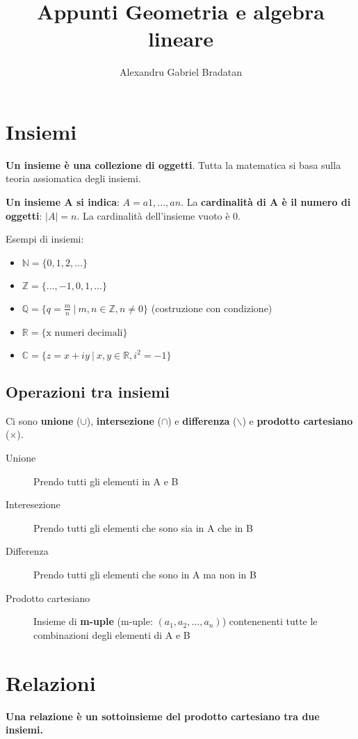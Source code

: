 \documentclass[a4paper,12pt,oneside]{article}
\title{Appunti Geometria e algebra lineare}
\author{Alexandru Gabriel Bradatan}
\date{}
\begin{document}
\maketitle

\section{Insiemi}
\textbf{Un insieme è una collezione di oggetti}. Tutta la matematica si basa 
sulla teoria assiomatica degli insiemi.

\textbf{Un insieme A si indica}: \( A = {a1,..., an} \). La \textbf{cardinalità di 
A è il numero di oggetti}: \(|A| = n\). La cardinalità dell'insieme vuoto è 0.

Esempi di insiemi:
\begin{itemize}
    \item \( \mathbb{N} = \{0, 1, 2,\dots\} \)
    \item \( \mathbb{Z} = \{\dots, -1, 0, 1,\dots\} \)
    \item \( \mathbb{Q} = \{q = \frac{m}{n} \: | \: m,n \in \mathbb{Z}, n \neq 0\} \) 
        (costruzione con condizione)
    \item \( \mathbb{R} = \{\text{x numeri decimali}\} \)
    \item \( \mathbb{C} = \{z = x + iy \: | \: x,y \in \mathbb{R}, i^2 = -1\} \)
\end{itemize}

\subsection{Operazioni tra insiemi}
Ci sono \textbf{unione} (\(\cup\)), \textbf{intersezione} (\(\cap\)) e 
\textbf{differenza} (\(\backslash\)) e \textbf{prodotto cartesiano} (\(\times\)).

\begin{description}
    \item[Unione] Prendo tutti gli elementi in A e B
    \item[Interesezione] Prendo tutti gli elementi che sono sia in A che in B
    \item[Differenza] Prendo tutti gli elementi che sono in A ma non in B
    \item[Prodotto cartesiano] Insieme di \textbf{m-uple} (m-uple: 
        \((a_1, a_2, \dots, a_n)\)) contenenenti tutte le combinazioni degli 
        elementi di A e B
\end{description}

\section{Relazioni}
\textbf{Una relazione è un sottoinsieme del prodotto cartesiano tra due insiemi.}
\end{document}
